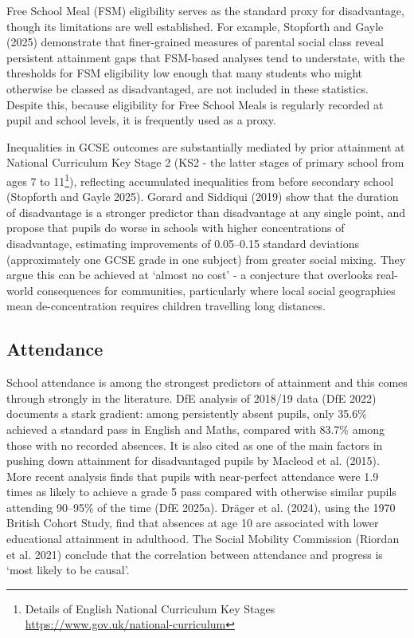 \documentclass[
  12pt,
  titlepage]{article}
\begin{document}
Free School Meal (FSM) eligibility serves as the standard proxy for
disadvantage, though its limitations are well established. For example,
Stopforth and Gayle (2025) demonstrate that finer-grained measures of
parental social class reveal persistent attainment gaps that FSM-based
analyses tend to understate, with the thresholds for FSM eligibility low
enough that many students who might otherwise be classed as
disadvantaged, are not included in these statistics. Despite this,
because eligibility for Free School Meals is regularly recorded at pupil
and school levels, it is frequently used as a proxy.

Inequalities in GCSE outcomes are substantially mediated by prior
attainment at National Curriculum Key Stage 2 (KS2 - the latter stages
of primary school from ages 7 to 11\footnote{Details of English National
  Curriculum Key Stages \url{https://www.gov.uk/national-curriculum}}),
reflecting accumulated inequalities from before secondary school
(Stopforth and Gayle 2025). Gorard and Siddiqui (2019) show that the
duration of disadvantage is a stronger predictor than disadvantage at
any single point, and propose that pupils do worse in schools with
higher concentrations of disadvantage, estimating improvements of
0.05--0.15 standard deviations (approximately one GCSE grade in one
subject) from greater social mixing. They argue this can be achieved at
`almost no cost' - a conjecture that overlooks real-world consequences
for communities, particularly where local social geographies mean
de-concentration requires children travelling long distances.

\subsection{Attendance}\label{attendance}

School attendance is among the strongest predictors of attainment and
this comes through strongly in the literature. DfE analysis of 2018/19
data (DfE 2022) documents a stark gradient: among persistently absent
pupils, only 35.6\% achieved a standard pass in English and Maths,
compared with 83.7\% among those with no recorded absences. It is also
cited as one of the main factors in pushing down attainment for
disadvantaged pupils by Macleod et al. (2015). More recent analysis
finds that pupils with near-perfect attendance were 1.9 times as likely
to achieve a grade 5 pass compared with otherwise similar pupils
attending 90--95\% of the time (DfE 2025a). Dräger et al. (2024), using
the 1970 British Cohort Study, find that absences at age 10 are
associated with lower educational attainment in adulthood. The Social
Mobility Commission (Riordan et al. 2021) conclude that the correlation
between attendance and progress is `most likely to be causal'.
\end{document}
